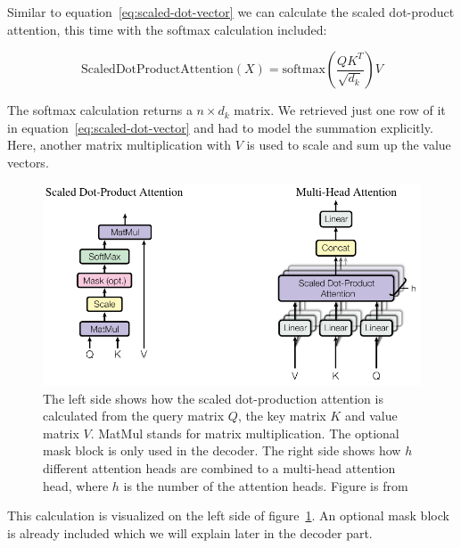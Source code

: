 \documentclass[a4paper]{scrartcl}
\begin{document}
    Similar to equation~\ref{eq:scaled-dot-vector} we can calculate the scaled dot-product attention, this time with the softmax calculation included:

    \begin{equation}
        \text{ScaledDotProductAttention}(X) = \text{softmax}(\frac{QK^T}{\sqrt {d_k}})V \label{eq:scaled-dot-mat}
    \end{equation}

    The softmax calculation returns a $n\times d_k$ matrix.
    We retrieved just one row of it in equation~\ref{eq:scaled-dot-vector} and had to model the summation explicitly.
    Here, another matrix multiplication with $V$ is used to scale and sum up the value vectors.

    \begin{figure}[btp]
        \centering
        \includegraphics[width=0.75\linewidth]{img/TransfomerAttentionAndMultihead}
        \caption[Scaled dot-product attention and multi-head attention]{The left side shows how the scaled dot-production attention is calculated from the query matrix $Q$, the key matrix $K$ and value matrix $V$.
        MatMul stands for matrix multiplication.
        The optional mask block is only used in the decoder.
        The right side shows how $h$ different attention heads are combined to a multi-head attention head, where $h$ is the number of the attention heads.
        Figure is from~\cite{vaswani2017attention}}
        \label{fig:transformer-attention-calculation}
    \end{figure}

    This calculation is visualized on the left side of figure~\ref{fig:transformer-attention-calculation}.
    An optional mask block is already included which we will explain later in the decoder part.
\end{document}
